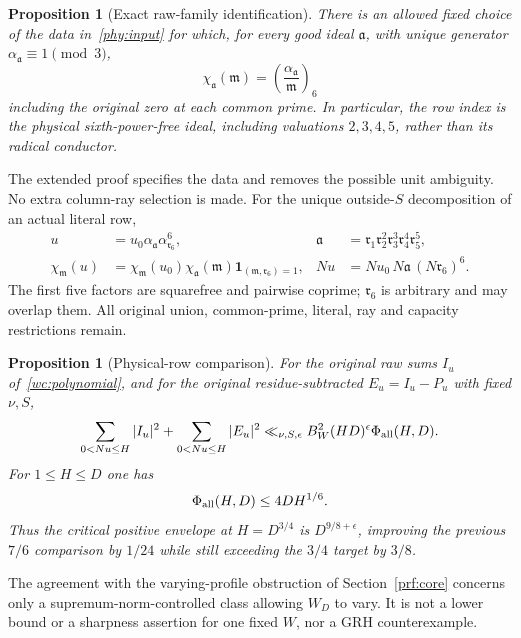 \documentclass[11pt]{article}
\newtheorem{proposition}[theorem]{Proposition}
\theoremstyle{definition}\newtheorem{definition}[theorem]{Definition}
\theoremstyle{remark}\newtheorem{remark}[theorem]{Remark}
\begin{document}
\begin{proposition}[Exact raw-family identification]\label{phy:family}
There is an allowed fixed choice of the data in~\eqref{phy:input}
for which, for every good ideal $\mathfrak a$, with unique generator
$\alpha_{\mathfrak a}\equiv1\pmod3$,
\[
 \chi_{\mathfrak a}(\mathfrak m)
       =\left(\frac{\alpha_{\mathfrak a}}{\mathfrak m}\right)_6
\]
including the original zero at each common prime.
In particular, the row index is the physical sixth-power-free ideal,
including valuations $2,3,4,5$, rather than its radical conductor.
\end{proposition}
The extended proof specifies the data and removes the possible unit
ambiguity. No extra column-ray selection is made.
For the unique outside-$S$ decomposition of an actual literal row,
\begin{equation}\label{phy:raw}
 \begin{aligned}
 u&=u_0\alpha_{\mathfrak a}\alpha_{\mathfrak r_6}^6,
 &\mathfrak a&=\mathfrak r_1\mathfrak r_2^2
              \mathfrak r_3^3\mathfrak r_4^4\mathfrak r_5^5,\\
 \chi_{\mathfrak m}(u)
   &=\chi_{\mathfrak m}(u_0)\chi_{\mathfrak a}(\mathfrak m)
                  \mathbf1_{(\mathfrak m,\mathfrak r_6)=1},
 &Nu&=Nu_0\,N\mathfrak a\,(N\mathfrak r_6)^6.
 \end{aligned}
\end{equation}
The first five factors are squarefree and pairwise coprime;
$\mathfrak r_6$ is arbitrary and may overlap them. All original
union, common-prime, literal, ray and capacity restrictions remain.

\begin{proposition}[Physical-row comparison]\label{phy:global}
For the original raw sums $I_u$ of~\eqref{wc:polynomial}, and for
the original residue-subtracted $E_u=I_u-P_u$ with fixed $\nu,S$,
\[
 \sum_{0<Nu\le H}|I_u|^2+\sum_{0<Nu\le H}|E_u|^2
 \ll_{\nu,S,\epsilon}B_W^2(HD)^\epsilon\Phi_{\rm all}(H,D).
\]
For $1\le H\le D$ one has
\begin{equation}\label{phy:dominance}
 \Phi_{\rm all}(H,D)\le4DH^{1/6}.
\end{equation}
Thus the critical positive envelope at $H=D^{3/4}$ is $D^{9/8+\epsilon}$,
improving the previous $7/6$ comparison by $1/24$ while still exceeding
the $3/4$ target by $3/8$.
\end{proposition}
The agreement with the varying-profile obstruction of
Section~\ref{prf:core} concerns only a supremum-norm-controlled class
allowing $W_D$ to vary. It is not a lower bound or a sharpness assertion
for one fixed $W$, nor a GRH counterexample.
\end{document}
